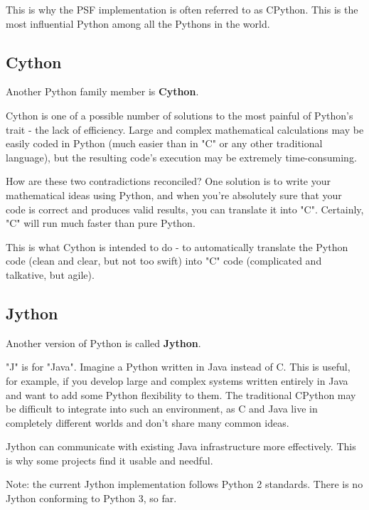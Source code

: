 \documentclass[a4paper,10pt]{article}
\begin{document}
This is why the PSF implementation is often referred to as CPython. This is the most influential Python among all the Pythons in the world.
\newline

\subsection{Cython}
Another Python family member is \textbf{Cython}.
\newline

Cython is one of a possible number of solutions to the most painful of Python's trait - the lack of efficiency. Large and complex mathematical calculations may be easily coded in Python (much easier than in "C" or any other traditional language), but the resulting code's execution may be extremely time-consuming.
\newline

How are these two contradictions reconciled? One solution is to write your mathematical ideas using Python, and when you're absolutely sure that your code is correct and produces valid results, you can translate it into "C". Certainly, "C" will run much faster than pure Python.
\newline

This is what Cython is intended to do - to automatically translate the Python code (clean and clear, but not too swift) into "C" code (complicated and talkative, but agile).

\subsection{Jython}
Another version of Python is called \textbf{Jython}.
\newline

"J" is for "Java". Imagine a Python written in Java instead of C. This is useful, for example, if you develop large and complex systems written entirely in Java and want to add some Python flexibility to them. The traditional CPython may be difficult to integrate into such an environment, as C and Java live in completely different worlds and don't share many common ideas.
\newline

Jython can communicate with existing Java infrastructure more effectively. This is why some projects find it usable and needful.
\newline

Note: the current Jython implementation follows Python 2 standards. There is no Jython conforming to Python 3, so far.
\end{document}
